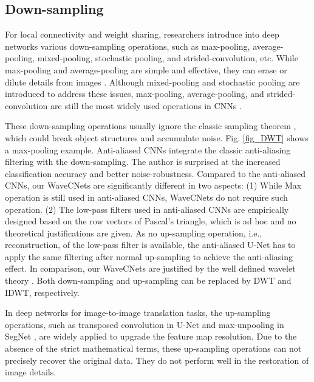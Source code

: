 \documentclass[10pt,twocolumn,letterpaper]{article}
\begin{document}
\subsection{Down-sampling}
For local connectivity and weight sharing, researchers introduce into deep networks various down-sampling operations,
such as max-pooling, average-pooling, mixed-pooling, stochastic pooling, and strided-convolution, etc.
While max-pooling and average-pooling are simple and effective,
they can erase or dilute details from images \cite{yu2014mixed,zeiler2013stochastic}.
Although mixed-pooling \cite{yu2014mixed} and stochastic pooling \cite{zeiler2013stochastic} are introduced to address these issues,
max-pooling, average-pooling, and strided-convolution are still the most widely used operations in CNNs
\cite{he2016deep,huang2017densely,sandler2018mobilenetv2,simonyan2014very}.

These down-sampling operations usually ignore the classic sampling theorem \cite{azulay2018deep,zhang2019making},
which could break object structures and accumulate noise.
Fig. \ref{fig_DWT} shows a max-pooling example.
Anti-aliased CNNs \cite{zhang2019making} integrate the classic anti-aliasing filtering with the down-sampling.
The author is surprised at the increased classification accuracy and better noise-robustness.
Compared to the anti-aliased CNNs, our WaveCNets are significantly different in two aspects:
(1) While Max operation is still used in anti-aliased CNNs, WaveCNets do not require such operation.
(2) The low-pass filters used in anti-aliased CNNs are empirically designed based on the row vectors of Pascal's triangle,
which is ad hoc and no theoretical justifications are given.
As no up-sampling operation, i.e., reconstruction, of the low-pass filter is available,
the anti-aliased U-Net \cite{zhang2019making} has to apply the same filtering after normal up-sampling to achieve the anti-aliasing effect.
In comparison, our WaveCNets are justified by the well defined wavelet theory \cite{daubechies1992ten,mallat1989theory}.
Both down-sampling and up-sampling can be replaced by DWT and IDWT, respectively.

In deep networks for image-to-image translation tasks, the up-sampling operations,
such as transposed convolution in U-Net \cite{ronneberger2015u_net} and max-unpooling in SegNet \cite{badrinarayanan2017segnet},
are widely applied to upgrade the feature map resolution.
Due to the absence of the strict mathematical terms,
these up-sampling operations can not precisely recover the original data.
They do not perform well in the restoration of image details.
\end{document}
